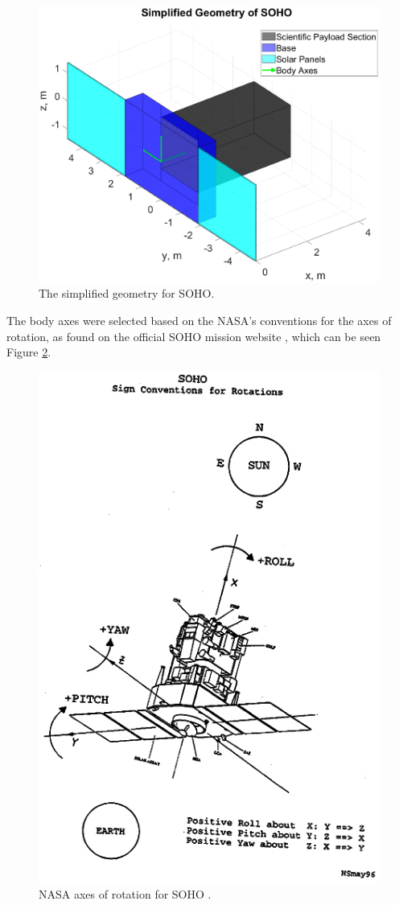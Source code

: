 \documentclass[12pt,a4paper,notitlepage]{article}
\begin{document}
\begin{figure}[H]
  \centering
    \includegraphics[width=\textwidth]{Images/SOHO_plain.eps}
  \caption{The simplified geometry for SOHO.}
  \label{fig:SOHO_simple}
\end{figure}

The body axes were selected based on the NASA's conventions for the axes of rotation, as found on the official SOHO mission website \cite{website:soho_nasa}, which can be seen Figure \ref{fig:SOHO_conv}.

\begin{figure}[H]
  \centering
    \includegraphics[width=.5\textwidth]{Images/SOHOconv.jpg}
  \caption{NASA axes of rotation for SOHO \cite{website:soho_nasa}.}
  \label{fig:SOHO_conv}
\end{figure}
\end{document}
